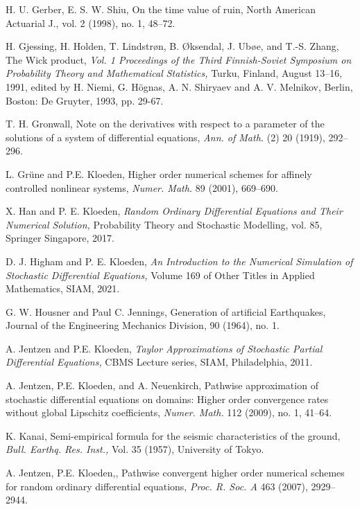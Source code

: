 \documentclass[reqno,12pt]{amsart}
\theoremstyle{plain} %
\theoremstyle{definition} %
\begin{document}
\begin{thebibliography}{25}
     H. U. Gerber, E. S. W. Shiu, On the time value of ruin, North American Actuarial J., vol. 2 (1998), no. 1, 48--72.

     H. Gjessing, H. Holden, T. Lindstr{\o}n, B. {\O}ksendal, J. Ub{\o}e, and T.-S. Zhang, The Wick product, \emph{Vol. 1 Proceedings of the Third Finnish-Soviet Symposium on Probability Theory and Mathematical Statistics,} Turku, Finland, August 13--16, 1991, edited by H. Niemi, G. H\"ognas, A. N. Shiryaev and A. V. Melnikov, Berlin, Boston: De Gruyter, 1993, pp. 29-67.

     T. H. Gronwall, Note on the derivatives with respect to a parameter of the solutions of a system of differential equations, \emph{Ann. of Math.} (2) 20 (1919), 292--296.

     L. Gr\"une and P.E. Kloeden, Higher order numerical schemes for affinely controlled nonlinear systems, \emph{Numer. Math.} 89 (2001), 669--690.

     X. Han and P. E. Kloeden, \emph{Random Ordinary Differential Equations and Their Numerical Solution,} Probability Theory and Stochastic Modelling, vol. 85, Springer Singapore, 2017.

     D. J. Higham and P. E. Kloeden, \emph{An Introduction to the Numerical Simulation of Stochastic Differential Equations,} Volume 169 of Other Titles in Applied Mathematics, SIAM, 2021.

     G. W. Housner and Paul C. Jennings, Generation of artificial Earthquakes, Journal of the Engineering Mechanics Division, 90 (1964), no. 1.

     A. Jentzen and P.E. Kloeden, \emph{Taylor Approximations of Stochastic Partial Differential Equations,} CBMS Lecture series, SIAM, Philadelphia, 2011.

     A. Jentzen, P.E. Kloeden, and A. Neuenkirch, Pathwise approximation of stochastic differential equations on domains: Higher order convergence rates without global Lipschitz coefficients, \emph{Numer. Math.} 112 (2009), no. 1, 41--64.

     K. Kanai, Semi-empirical formula for the seismic characteristics of the ground, \emph{Bull. Earthq. Res. Inst.,} Vol. 35 (1957), University of Tokyo.

     A. Jentzen, P.E. Kloeden,, Pathwise convergent higher order numerical schemes for random ordinary differential equations, \emph{Proc. R. Soc. A} 463 (2007), 2929--2944.


\end{thebibliography}
\end{document}

